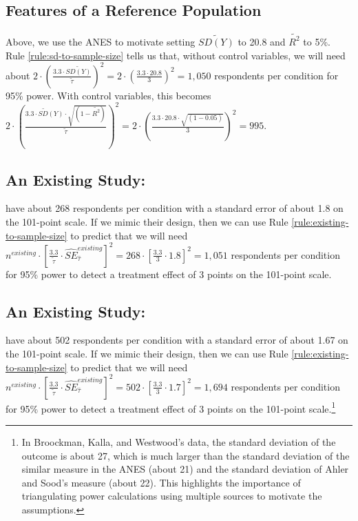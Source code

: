 \documentclass[12pt]{article}
\begin{document}
\subsection*{Features of a Reference Population}

Above, we use the ANES to motivate setting $\widetilde{SD(Y)}$ to 20.8 and $\widetilde{R^{2}}$ to 5\%. 
Rule \ref{rule:sd-to-sample-size} tells us that, without control variables, we will need about $2 \cdot \left( \frac{3.3 \cdot \widetilde{SD(Y)}}{\widetilde{\tau}} \right)^{2} = 2 \cdot \left( \frac{3.3 \cdot 20.8}{3} \right)^{2} = 1,050$ respondents per condition for 95\% power. 
With control variables, this becomes ${2 \cdot \left( \frac{\widetilde{3.3 \cdot SD(Y)} \cdot \sqrt{\left( 1 - \widetilde{R^{2}} \right)}}{\widetilde{\tau}} \right)}^{2} = 2 \cdot \left( \frac{3.3 \cdot 20.8 \cdot \sqrt{(1 - 0.05)}}{3} \right)^{2} = 995$.

\subsection*{An Existing Study: \cite{Ahler2018}}

\cite{Ahler2018} have about 268 respondents per condition with a
standard error of about 1.8 on the 101-point scale. 
If we mimic their design, then we can use Rule \ref{rule:existing-to-sample-size} to predict that we will need $n^{existing} \cdot \left\lbrack \frac{3.3}{\widetilde{\tau}} \cdot {\widehat{SE}}_{\widehat{\tau}}^{existing} \right\rbrack^{2} = 268 \cdot \left\lbrack \frac{3.3}{3} \cdot 1.8 \right\rbrack^{2} = 1,051$ respondents per condition for 95\% power to detect a treatment effect of 3 points on the 101-point scale.

\subsection*{An Existing Study: \cite{Broockman2022}}

\cite{Broockman2022} have about 502 respondents per condition with a standard error of about 1.67 on the 101-point scale.
If we mimic their design, then we can use Rule \ref{rule:existing-to-sample-size} to predict that we will need $n^{existing} \cdot \left\lbrack \frac{3.3}{\widetilde{\tau}} \cdot {\widehat{SE}}_{\widehat{\tau}}^{existing} \right\rbrack^{2} = 502 \cdot \left\lbrack \frac{3.3}{3} \cdot 1.7 \right\rbrack^{2} =1,694$ respondents per condition for 95\% power to detect a treatment effect of 3 points on the 101-point scale.\footnote{
  In Broockman, Kalla, and Westwood's data, the standard deviation of the outcome is about 27, which is much larger than the standard deviation of the similar measure in the ANES (about 21) and the standard deviation of Ahler and Sood's measure (about 22). 
  This highlights the importance of triangulating power calculations using multiple sources to motivate the assumptions.
  }
\end{document}
